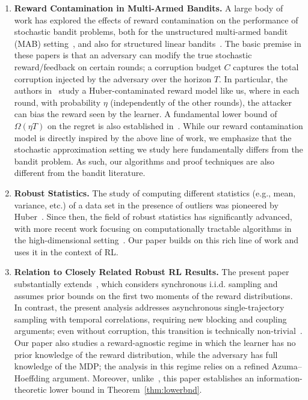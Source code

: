 \documentclass{article}
\begin{document}
\begin{enumerate}
\item \textbf{Reward Contamination in Multi-Armed Bandits.} A large body of work has explored the effects of reward contamination on the performance of stochastic bandit problems, both for the unstructured multi-armed bandit (MAB) setting~\citep{junadv,liuadv, kapoor, lykouris,guptaadv}, and also for structured linear bandits~\citep{bogunovic1,garcelon,bogunovic,he22}. The basic premise in these papers is that an adversary can modify the true stochastic reward/feedback on certain rounds; a corruption budget $C$ captures the total corruption injected by the adversary over the horizon $T$. In particular, the authors in~\cite{kapoor} study a Huber-contaminated reward model like us, where in each round, with probability $\eta$ (independently of the other rounds), the attacker can bias the reward seen by the learner. A fundamental lower bound of $\Omega(\eta T)$ on the regret is also established in~\cite{kapoor}. While our reward contamination model is directly inspired by the above line of work, {we emphasize that the stochastic approximation setting we study here fundamentally differs from the bandit problem}. As such, our algorithms and proof techniques are also different from the bandit literature. 

\item \textbf{Robust Statistics.} The study of computing different statistics (e.g., mean, variance, etc.) of a data set in the presence of outliers was pioneered by Huber~\citep{huber, huber2}. Since then, the field of robust statistics has significantly advanced, with more recent work focusing on computationally tractable algorithms in the high-dimensional setting~\citep{lai, chenrobust, minsker, cheng, lugosi, Dalal2}. Our paper builds on this rich line of work and uses it in the context of RL. 

\item \textbf{Relation to Closely Related Robust RL Results.}
The present paper substantially extends~\citet{maity2024robust}, which considers synchronous i.i.d. sampling and assumes prior bounds on the first two moments of the reward distributions. In contrast, the present analysis addresses asynchronous single-trajectory sampling with temporal correlations, requiring new blocking and coupling arguments; even without corruption, this transition is technically non-trivial~\cite{Qu,bhandari_finite}. Our paper also studies a reward-agnostic regime in which the learner has no prior knowledge of the reward distribution, while the adversary has full knowledge of the MDP; the analysis in this regime relies on a refined Azuma--Hoeffding argument. Moreover, unlike~\citet{maity2024robust}, this paper establishes an information-theoretic lower bound in Theorem~\ref{thm:lowerbnd}. 


\end{enumerate}
\end{document}
